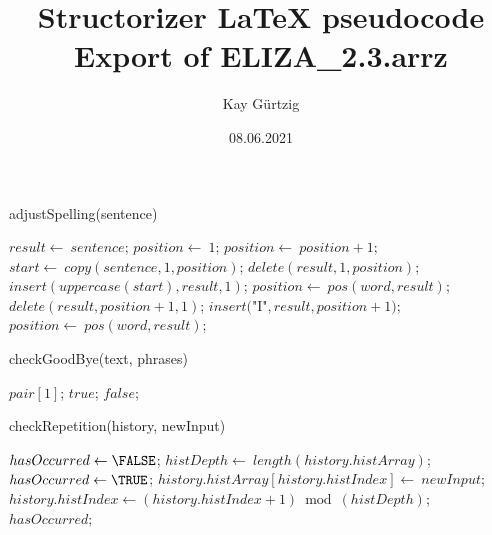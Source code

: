 \documentclass[a4paper,10pt]{article}
\title{Structorizer LaTeX pseudocode Export of ELIZA_2.3.arrz}
\author{Kay Gürtzig}
\date{08.06.2021}
\begin{document}
\begin{algorithm}
\caption{adjustSpelling(sentence)}
\begin{algorithmic}[5]

\STATE {}
  \STATE \(result\gets\ sentence\);
  \STATE \(position\gets\ 1\);
    \STATE \(position\gets\ position+1\);
  \ENDWHILE
    \STATE \(start\gets\ copy(sentence,1,position)\);
    \STATE \(delete(result,1,position)\);
    \STATE \(insert(uppercase(start),result,1)\);
  \ENDIF
    \STATE \(position\gets\ pos(word,result)\);
      \STATE \(delete(result,position+1,1)\);
      \STATE \(insert(\)"{}I"{}\(,result,position+1)\);
      \STATE \(position\gets\ pos(word,result)\);
    \ENDWHILE
  \ENDFOR

\end{algorithmic}
\end{algorithm}


\begin{algorithm}
\caption{checkGoodBye(text, phrases)}
\begin{algorithmic}[5]

\STATE {}
\STATE {}
\STATE {}
\STATE {}
      \PRINT\(pair[1]\);
      \RETURN\(true\);
    \ENDIF
  \ENDFOR
  \RETURN\(false\);

\end{algorithmic}
\end{algorithm}


\begin{algorithm}
\caption{checkRepetition(history, newInput)}
\begin{algorithmic}[5]

\STATE {}
\STATE {}
  \STATE \(hasOccurred\gets\FALSE\);
    \STATE \(histDepth\gets\ length(history.histArray)\);
        \STATE \(hasOccurred\gets\TRUE\);
      \ENDIF
    \ENDFOR
    \STATE \(history.histArray[history.histIndex]\gets\ newInput\);
    \STATE \(history.histIndex\gets(history.histIndex+1)\bmod(histDepth)\);
  \ENDIF
  \RETURN\(hasOccurred\);

\end{algorithmic}
\end{algorithm}
\end{document}
